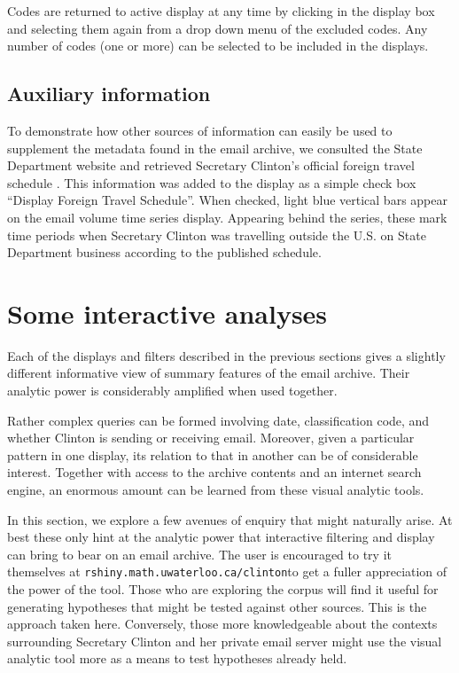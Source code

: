 \documentclass[journal]{vgtc}                %
\begin{document}
Codes are returned to active display at any time by clicking in the display box and selecting them again from a drop down menu of the excluded codes.  Any number of codes  (one or more) can be selected to be included in the displays.

\subsection{Auxiliary information}
To demonstrate how other sources of information can easily be used to supplement the metadata found in the email archive, we consulted the State Department website and retrieved Secretary Clinton's official foreign travel schedule  \cite{ForeignSched}.  This information was added to the display as a simple check box ``Display Foreign Travel Schedule''.  When checked, light blue vertical bars appear on the  email volume time series display.  Appearing behind the series, these mark time periods when Secretary Clinton was travelling outside the U.S. on State Department business according to the published schedule.

\section{Some interactive analyses}
\label{sect:Analysis}
Each of the displays and filters described in the previous sections gives a slightly different informative view of summary features of the email archive.  Their analytic power is considerably amplified when used together.  

Rather complex queries can be formed involving date, classification code, and whether Clinton is sending or receiving email.  Moreover, given a particular pattern in one display, its relation to that in another can be of considerable interest.   Together with access to the archive contents and an internet search engine, an enormous amount can be learned from these visual analytic tools.

In this section, we explore a few avenues of enquiry that might naturally arise.  At best these only hint at the analytic power that interactive filtering and display can bring to bear on an email archive.  The user is encouraged to try it themselves at \texttt{rshiny.math.uwaterloo.ca/clinton}to get a fuller appreciation of the power of the tool.  Those who are exploring the corpus will find it useful for generating hypotheses that might be tested against other sources.   This is the approach taken here.  Conversely, those more knowledgeable about the contexts surrounding Secretary Clinton and her private email server might use the visual analytic tool more as a means to test hypotheses already held.
\end{document}
